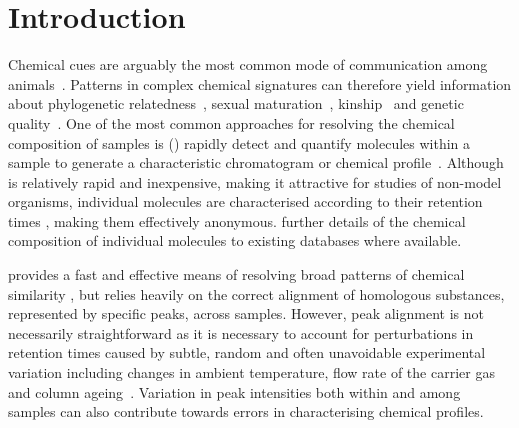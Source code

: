 \documentclass[10pt,letterpaper]{article}
\begin{document}
\section*{Introduction}
Chemical cues are arguably the most common mode of communication among animals~\cite{Wyatt.2014}. Patterns in complex chemical signatures can therefore yield information about phylogenetic relatedness~\cite{Meulemeester.2011}, sexual maturation~\cite{Caspers.2011}, kinship~\cite{Bonadonna.2012, Krause.2012, Stoffel.2015} and genetic quality~\cite{Charpentier.2010, Leclaire.2012, Stoffel.2015}. One of the most common approaches for resolving the chemical composition of samples is   ()   rapidly detect and quantify molecules within a sample to generate a characteristic  chromatogram or chemical profile~\cite{McNair.2011}. 
Although  is relatively rapid and inexpensive, making it attractive for studies of non-model organisms, individual molecules are characterised according to their retention times , making them effectively anonymous.   further details of the chemical composition of individual molecules   to existing databases where available.\par
{} provides a fast and effective means of resolving broad patterns of chemical similarity , but relies heavily on the correct alignment of homologous substances, represented by specific peaks, across samples. However, peak alignment is not necessarily straightforward as it is necessary to account for perturbations in retention times caused by subtle, random and often unavoidable experimental variation including changes in ambient temperature, flow rate of the carrier gas and column ageing~\cite{Scott.2003, Pierce.2005}.  Variation in peak intensities both within and among samples can also contribute towards errors in characterising chemical profiles. \par
\end{document}
